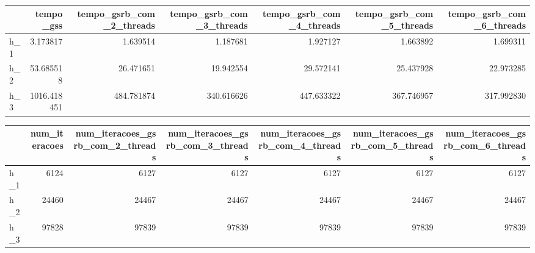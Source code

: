 \begin{tabular}{lrrrrrr}
\toprule
 & tempo_gss & tempo_gsrb_com_2_threads & tempo_gsrb_com_3_threads & tempo_gsrb_com_4_threads & tempo_gsrb_com_5_threads & tempo_gsrb_com_6_threads \\
\midrule
h_1 & 3.173817 & 1.639514 & 1.187681 & 1.927127 & 1.663892 & 1.699311 \\
h_2 & 53.685518 & 26.471651 & 19.942554 & 29.572141 & 25.437928 & 22.973285 \\
h_3 & 1016.418451 & 484.781874 & 340.616626 & 447.633322 & 367.746957 & 317.992830 \\
\bottomrule
\end{tabular}

\begin{tabular}{lrrrrrr}
\toprule
 & num_iteracoes & num_iteracoes_gsrb_com_2_threads & num_iteracoes_gsrb_com_3_threads & num_iteracoes_gsrb_com_4_threads & num_iteracoes_gsrb_com_5_threads & num_iteracoes_gsrb_com_6_threads \\
\midrule
h_1 & 6124 & 6127 & 6127 & 6127 & 6127 & 6127 \\
h_2 & 24460 & 24467 & 24467 & 24467 & 24467 & 24467 \\
h_3 & 97828 & 97839 & 97839 & 97839 & 97839 & 97839 \\
\bottomrule
\end{tabular}
